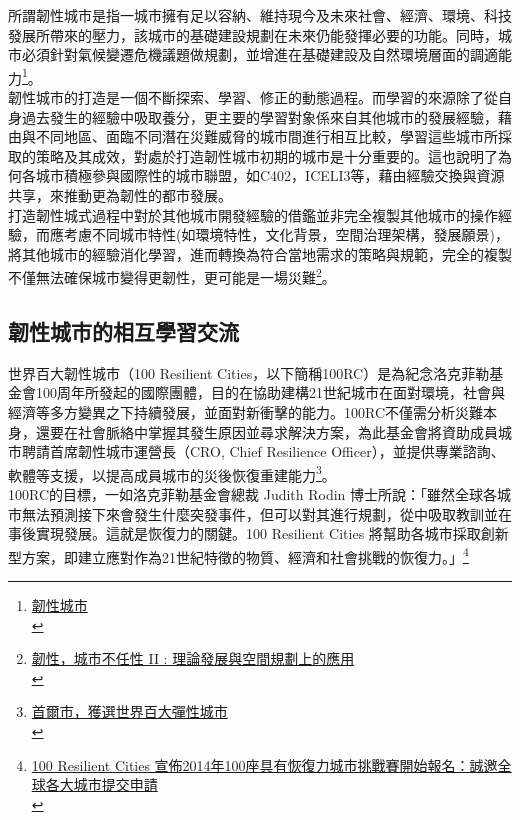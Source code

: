 \documentclass[a4paper,12pt]{article}
\begin{document}
所謂韌性城市是指一城市擁有足以容納、維持現今及未來社會、經濟、環境、科技發展所帶來的壓力，該城市的基礎建設規劃在未來仍能發揮必要的功能。同時，城市必須針對氣候變遷危機議題做規劃，並增進在基礎建設及自然環境層面的調適能力\footnote{\href{https://wiki.mbalib.com/zh-tw/\%E9\%9F\%A7\%E6\%80\%A7\%E5\%9F\%8E\%E5\%B8\%82}{韌性城市}\\\label{org548d79e}}。\\

韌性城市的打造是一個不斷探索、學習、修正的動態過程。而學習的來源除了從自身過去發生的經驗中吸取養分，更主要的學習對象係來自其他城市的發展經驗，藉由與不同地區、面臨不同潛在災難威脅的城市間進行相互比較，學習這些城市所採取的策略及其成效，對處於打造韌性城市初期的城市是十分重要的。這也說明了為何各城市積極參與國際性的城市聯盟，如C402，ICELI3等，藉由經驗交換與資源共享，來推動更為韌性的都市發展。\\

打造韌性城式過程中對於其他城市開發經驗的借鑑並非完全複製其他城市的操作經驗，而應考慮不同城市特性(如環境特性，文化背景，空間治理架構，發展願景)，將其他城市的經驗消化學習，進而轉換為符合當地需求的策略與規範，完全的複製不僅無法確保城市變得更韌性，更可能是一場災難\footnote{\href{https://eyesonplace.net/2016/05/11/2201/}{韌性，城市不任性 II : 理論發展與空間規劃上的應用}\\}。\\
\newpage

\subsection{韌性城市的相互學習交流}
\label{sec:orge841239}

世界百大韌性城市（100 Resilient Cities，以下簡稱100RC）是為紀念洛克菲勒基金會100周年所發起的國際團體，目的在協助建構21世紀城市在面對環境，社會與經濟等多方變異之下持續發展，並面對新衝擊的能力。100RC不僅需分析災難本身，還要在社會脈絡中掌握其發生原因並尋求解決方案，為此基金會將資助成員城市聘請首席韌性城市運營長（CRO, Chief Resilience Officer），並提供專業諮詢、軟體等支援，以提高成員城市的災後恢復重建能力\footnote{\href{http://tchinese.seoul.go.kr/\%E9\%A6\%96\%E7\%88\%BE\%E5\%B8\%82\%EF\%BC\%8C\%E7\%8D\%B2\%E9\%81\%B8\%E4\%B8\%96\%E7\%95\%8C\%E7\%99\%BE\%E5\%A4\%A7\%E5\%BD\%88\%E6\%80\%A7\%E5\%9F\%8E\%E5\%B8\%82/?print=print}{首爾市，獲選世界百大彈性城市}\\}。\\

100RC的目標，一如洛克菲勒基金會總裁 Judith Rodin 博士所說：「雖然全球各城市無法預測接下來會發生什麼突發事件，但可以對其進行規劃，從中吸取教訓並在事後實現發展。這就是恢復力的關鍵。100 Resilient Cities 將幫助各城市採取創新型方案，即建立應對作為21世紀特徵的物質、經濟和社會挑戰的恢復力。」\footnote{\href{https://hk.prnasia.com/story/101563-2.shtml}{100 Resilient Cities 宣佈2014年100座具有恢復力城市挑戰賽開始報名：誠邀全球各大城市提交申請}\\}\\
\end{document}
